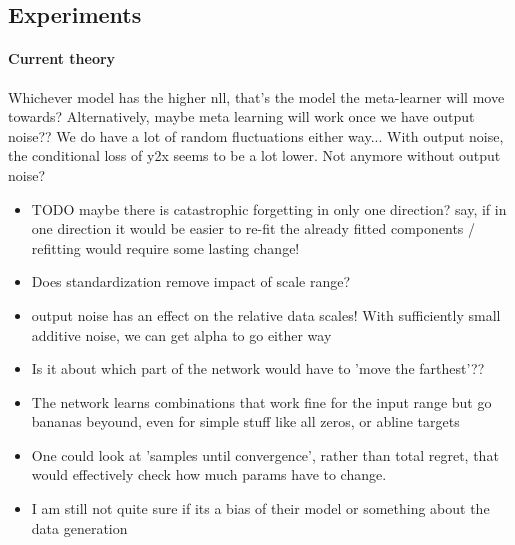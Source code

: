 \documentclass{article}
\begin{document}
\subsection{Experiments}
\paragraph{Current theory}
Whichever model has the higher nll, that's the model the meta-learner will move towards?
Alternatively, maybe meta learning will work once we have output noise??
We do have a lot of random fluctuations either way...
With output noise, the conditional loss of y2x seems to be a lot lower. Not anymore without output noise?
\begin{itemize}
    \item TODO maybe there is catastrophic forgetting in only one direction? say, if in one direction it would be easier to re-fit the already fitted components / refitting would require some lasting change!
    \item Does standardization remove impact of scale range?
    \item output noise has an effect on the relative data scales! With sufficiently small additive noise, we can get alpha to go either way
    \item Is it about which part of the network would have to 'move the farthest'??
    \item The network learns combinations that work fine for the input range but go bananas beyound, even for simple stuff like all zeros, or abline targets
    \item One could look at 'samples until convergence', rather than total regret, that would effectively check how much params have to change.
    \item I am still not quite sure if its a bias of their model or something about the data generation
\end{itemize}

\clearpage
\end{document}

